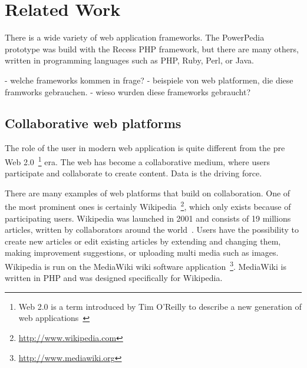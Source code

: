 \section{Related Work}

There is a wide variety of web application frameworks. The PowerPedia prototype was build with the Recess PHP framework, but there are many others, written in programming languages such as PHP, Ruby, Perl, or Java.   
 
- welche frameworks kommen in frage?
- beispiele von web platformen, die diese framworks gebrauchen. 
- wieso wurden diese frameworks gebraucht?

\subsection{Collaborative web platforms}
The role of the user in modern web application is quite different from the pre Web 2.0~\footnote{Web 2.0 is a term introduced by Tim O'Reilly to describe a new generation of web applications~\cite{web2_0}} era. The web has become a collaborative medium, where users participate and collaborate to create content. Data is the driving force.

There are many examples of web platforms that build on collaboration. One of the most prominent ones is certainly Wikipedia~\footnote{\url{http://www.wikipedia.com}}, which only exists because of participating users. Wikipedia was launched in 2001 and consists of 19 millions articles, written by collaborators around the world~\cite{wikipedia}. Users have the possibility to create new articles or edit existing articles by extending and changing them, making improvement suggestions, or uploading multi media such as images. Wikipedia is run on the MediaWiki wiki software application~\footnote{\url{http://www.mediawiki.org}}. MediaWiki is written in PHP and was designed specifically for Wikipedia. 


